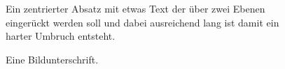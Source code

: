 \begin{figure}
\begin{center}
Ein zentrierter Absatz mit etwas Text der über zwei Ebenen eingerückt werden soll und dabei ausreichend lang ist damit ein harter Umbruch entsteht.
\end{center}
\caption{Eine Bildunterschrift.}
\end{figure}
